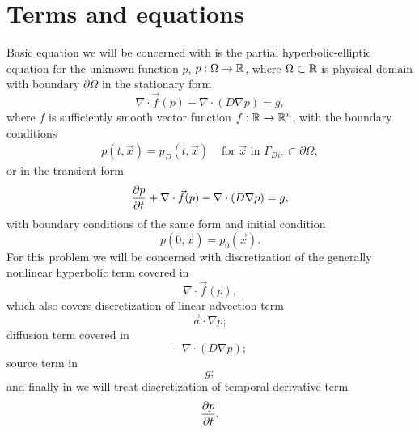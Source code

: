\providecommand{\elint}{\int_{T^k}}
\providecommand{\elbint}{\int_{\partial T^k}}
\section{Terms and equations}
Basic equation we will be concerned with is the partial hyperbolic-elliptic 
equation for the unknown function $p$, $p : \Omega \rightarrow \mathbb{R}$, where 
$\Omega \subset \mathbb{R}$ is physical domain with boundary $\partial\Omega$ in 
the stationary form
\begin{equation}
\label{eq:hyp_diff}
\nabla\cdot \vec{f}(p) -  \nabla \cdot (D \nabla p) = g,
\end{equation}
where $f$ is sufficiently smooth vector function $f: \mathbb{R} 
\rightarrow\mathbb{R}^n$, with the boundary conditions
\begin{align}\label{eq:diff_bcs}
p(t, \vec{x}) = p_D(t, \vec{x}) & \text{ for } \vec{x} \text{ in } 
\Gamma_{Dir} \subset \partial\Omega,
\end{align}
or in the transient form
\begin{equation}
\label{eq:hyp_diff_trans}
\frac{\partial p}{\partial t} + \nabla\cdot \vec{f}(p) -  \nabla \cdot (D \nabla p) = g,
\end{equation}
with boundary conditions of the same form and initial condition
\begin{equation}
\label{eq:diff_ic}
p(0, \vec{x}) = p_0(\vec{x}).
\end{equation}
For this problem we will be concerned with discretization of the generally 
nonlinear hyperbolic term covered in 
\begin{equation}
\nabla\cdot \vec{f}(p),
\end{equation}
which also covers discretization of linear advection term
\begin{equation}
\vec{a} \cdot \nabla p;
\end{equation}
diffusion term covered in 
\begin{equation}
-  \nabla \cdot (D \nabla p);
\end{equation}
source term in 
\begin{equation}
g;
\end{equation}
and finally in  we will 
treat discretization of temporal derivative term
\begin{equation}
\frac{\partial p}{\partial t}.
\end{equation}


